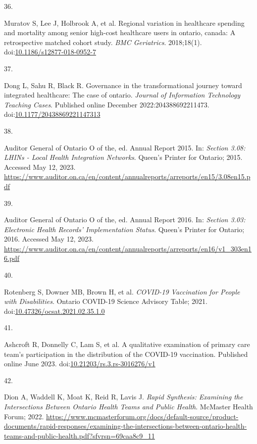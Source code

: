 \documentclass[
]{article}
\newlength{\cslhangindent}
\newlength{\csllabelwidth}
\newlength{\cslentryspacingunit} %
\newenvironment{CSLReferences}[2] %
 {%
  \setlength{\parindent}{0pt}
  \ifodd #1
  \let\oldpar\par
  \def\par{\hangindent=\cslhangindent\oldpar}
  \fi
  \setlength{\parskip}{#2\cslentryspacingunit}
 }%
 {}
\newcommand{\CSLLeftMargin}[1]{\parbox[t]{\csllabelwidth}{#1}}
\newcommand{\CSLRightInline}[1]{\parbox[t]{\linewidth - \csllabelwidth}{#1}\break}
\begin{document}
\begin{CSLReferences}{0}{0}
\leavevmode{}%
\CSLLeftMargin{36. }%
\CSLRightInline{Muratov S, Lee J, Holbrook A, et al. Regional variation
in healthcare spending and mortality among senior high-cost healthcare
users in ontario, canada: A retrospective matched cohort study.
\emph{{BMC} Geriatrics}. 2018;18(1).
doi:\href{https://doi.org/10.1186/s12877-018-0952-7}{10.1186/s12877-018-0952-7}}

\leavevmode{}%
\CSLLeftMargin{37. }%
\CSLRightInline{Dong L, Sahu R, Black R. Governance in the
transformational journey toward integrated healthcare: The case of
ontario. \emph{Journal of Information Technology Teaching Cases}.
Published online December 2022:204388692211473.
doi:\href{https://doi.org/10.1177/20438869221147313}{10.1177/20438869221147313}}

\leavevmode{}%
\CSLLeftMargin{38. }%
\CSLRightInline{Auditor General of Ontario O of the, ed. Annual {R}eport
2015. In: \emph{Section 3.08: LHINs - Local Health Integration
Networks}. Queen's Printer for Ontario; 2015. Accessed May 12, 2023.
\url{https://www.auditor.on.ca/en/content/annualreports/arreports/en15/3.08en15.pdf}}

\leavevmode{}%
\CSLLeftMargin{39. }%
\CSLRightInline{Auditor General of Ontario O of the, ed. Annual {R}eport
2016. In: \emph{Section 3.03: Electronic Health Records' Implementation
Status}. Queen's Printer for Ontario; 2016. Accessed May 12, 2023.
\url{https://www.auditor.on.ca/en/content/annualreports/arreports/en16/v1_303en16.pdf}}

\leavevmode{}%
\CSLLeftMargin{40. }%
\CSLRightInline{Rotenberg S, Downer MB, Brown H, et al. \emph{{COVID}-19
Vaccination for People with Disabilities}. Ontario {COVID}-19 Science
Advisory Table; 2021.
doi:\href{https://doi.org/10.47326/ocsat.2021.02.35.1.0}{10.47326/ocsat.2021.02.35.1.0}}

\leavevmode{}%
\CSLLeftMargin{41. }%
\CSLRightInline{Ashcroft R, Donnelly C, Lam S, et al. A qualitative
examination of primary care team's participation in the distribution of
the {COVID}-19 vaccination. Published online June 2023.
doi:\href{https://doi.org/10.21203/rs.3.rs-3016276/v1}{10.21203/rs.3.rs-3016276/v1}}

\leavevmode{}%
\CSLLeftMargin{42. }%
\CSLRightInline{Dion A, Waddell K, Moat K, Reid R, Lavis J. \emph{Rapid
Synthesis: Examining the Intersections Between Ontario Health Teams and
Public Health}. McMaster Health Forum; 2022.
\url{https://www.mcmasterforum.org/docs/default-source/product-documents/rapid-responses/examining-the-intersections-between-ontario-health-teams-and-public-health.pdf?sfvrsn=69caa8c9_11}}


\end{CSLReferences}
\end{document}
